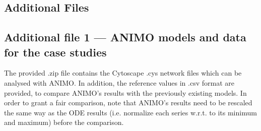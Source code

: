 \documentclass{bmcart}
\begin{document}
\begin{backmatter}

\clearpage

\section*{Additional Files}
  \subsection*{Additional file 1 --- ANIMO models and data for the case studies}
      The provided .zip file contains the Cytoscape .cys network files which can be analysed
      with ANIMO. In addition, the reference values in .csv format are provided, to compare
      ANIMO's results with the previously existing models. In order to grant a fair comparison,
      note that ANIMO's results need to be rescaled the same way as the ODE results
      (i.e. normalize each series w.r.t. to its minimum and maximum) before the comparison.


\end{backmatter}
\end{document}
